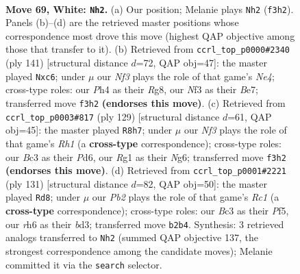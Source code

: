 \documentclass[11pt]{article}
\begin{document}
\clearpage

\begin{figure}[p]\centering
\begin{subfigure}{0.46\textwidth}\centering
\resizebox{\linewidth}{!}{%
\newchessgame
\chessboard[
  setfen={8/5kp1/p2b2rr/Pppb1p1p/2p2P1P/2B1PNP1/1P2K3/1R4R1 w - - 10 69},
  showmover=false,
  pgfstyle=straightmove, color=movearrow, markmove={f3-h2}
]}
\caption{}
\end{subfigure}\hfill
\begin{subfigure}{0.46\textwidth}\centering
\resizebox{\linewidth}{!}{%
\newchessgame
\chessboard[
  setfen={5rr1/4bp1k/b1Np2pP/2pPn3/p3PB2/P5R1/1PB5/6RK b - - 2 71},
  showmover=false,
  pgfstyle=straightmove, color=movearrow, markmove={e5-c6}
]}
\caption{}
\end{subfigure}
\\[4pt]
\begin{subfigure}{0.46\textwidth}\centering
\resizebox{\linewidth}{!}{%
\newchessgame
\chessboard[
  setfen={7r/1k1b4/1p1p2n1/p1p4r/P1P1Pp1p/1PB2P2/4K1PR/5B1R b - - 17 65},
  showmover=false,
  pgfstyle=straightmove, color=movearrow, markmove={h8-h7}
]}
\caption{}
\end{subfigure}\hfill
\begin{subfigure}{0.46\textwidth}\centering
\resizebox{\linewidth}{!}{%
\newchessgame
\chessboard[
  setfen={2r5/p3bkp1/Ppr1p1p1/5pP1/3P1P1P/n1PB1K2/4R3/R3B3 b - - 46 66},
  showmover=false,
  pgfstyle=straightmove, color=movearrow, markmove={c8-d8}
]}
\caption{}
\end{subfigure}
\caption{\textbf{Move 69, White: \texttt{Nh2}.} (a) Our position; Melanie plays \texttt{Nh2} (\texttt{f3h2}). Panels (b)--(d) are the retrieved master positions whose correspondence most drove this move (highest QAP objective among those that transfer to it). (b) Retrieved from \texttt{ccrl\_top\_p0000\#2340} (ply 141) [structural distance $d$=72, QAP obj=47]: the master played \texttt{Nxc6}; under $\mu$ our \emph{Nf3} plays the role of that game's \emph{Ne4}; cross-type roles: our \emph{P}h4 as their \emph{R}g8, our \emph{N}f3 as their \emph{B}e7; transferred move \texttt{f3h2} \textbf{(endorses this move)}. (c) Retrieved from \texttt{ccrl\_top\_p0003\#817} (ply 129) [structural distance $d$=61, QAP obj=45]: the master played \texttt{R8h7}; under $\mu$ our \emph{Nf3} plays the role of that game's \emph{Rh1} (a \textbf{cross-type} correspondence); cross-type roles: our \emph{B}c3 as their \emph{P}d6, our \emph{R}g1 as their \emph{N}g6; transferred move \texttt{f3h2} \textbf{(endorses this move)}. (d) Retrieved from \texttt{ccrl\_top\_p0001\#2221} (ply 131) [structural distance $d$=82, QAP obj=50]: the master played \texttt{Rd8}; under $\mu$ our \emph{Pb2} plays the role of that game's \emph{Rc1} (a \textbf{cross-type} correspondence); cross-type roles: our \emph{B}c3 as their \emph{P}f5, our \emph{r}h6 as their \emph{b}d3; transferred move \texttt{b2b4}. Synthesis: 3 retrieved analogs transferred to \texttt{Nh2} (summed QAP objective 137, the strongest correspondence among the candidate moves); Melanie committed it via the \texttt{search} selector.}
\label{fig:thought-m136}
\end{figure}
\end{document}
